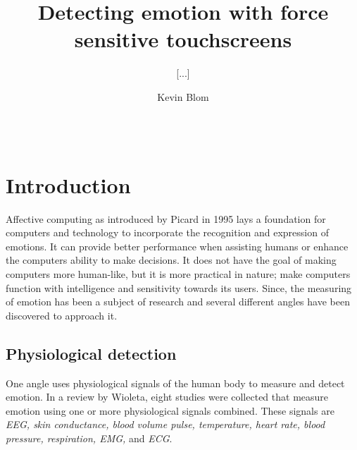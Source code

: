 \documentclass{sig-alternate}
\begin{document}
\title{Detecting emotion with force sensitive touchscreens}
\subtitle{[...]}


%
\author{
%
\alignauthor Kevin Blom\\
       \\
       \\
}

\maketitle

\begin{abstract}
	
\end{abstract}

\section{Introduction} %
\label{sec:introduction}
Affective computing as introduced by Picard\cite{Picard1995} in 1995 lays a foundation for computers and technology to incorporate the recognition and expression of emotions. It can provide better performance when assisting humans or enhance the computers ability to make decisions. It does not have the goal of making computers more human-like, but it is more practical in nature; make computers function with intelligence and sensitivity towards its users\cite{Picard1997}. Since, the measuring of emotion has been a subject of research and several different angles have been discovered to approach it. 

\subsection{Physiological detection} %
\label{sub:physiology}
One angle uses physiological signals of the human body to measure and detect emotion. In a review by Wioleta\cite{Wioleta2013}, eight studies were collected that measure emotion using one or more physiological signals combined. These signals are \textit{EEG, skin conductance, blood volume pulse, temperature, heart rate, blood pressure, respiration, EMG,} and \textit{ECG}.
\end{document}
